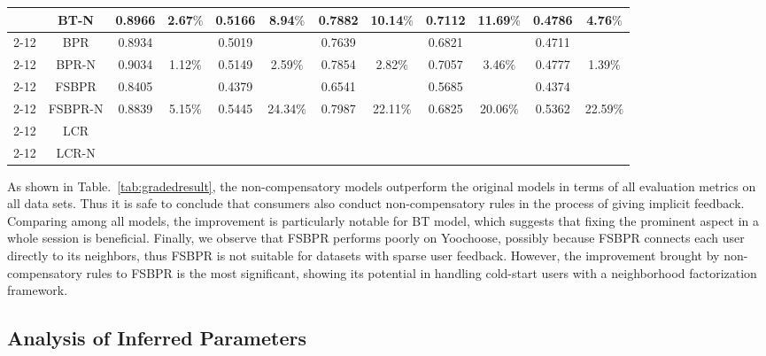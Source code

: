 \documentclass[letterpaper]{article} %
\begin{document}
\begin{table*}[ht]
\begin{center}
\begin{tabular}{|c|c|c|c|c|c|c|c|c|c|c|c|}
	&BT-N	&0.8966 &	2.67$\%$	&0.5166 	&8.94$\%$&	0.7882 	&10.14$\%$&	0.7112 	&11.69$\%$	&0.4786 &	4.76$\%$\\\cline{2-12}
	&BPR	&0.8934 	&&	0.5019 	&&	0.7639 	&&	0.6821 	&&	0.4711 	&\\\cline{2-12}
	&BPR-N	&0.9034 &	1.12$\%$&	0.5149 	&2.59$\%$&	0.7854 &	2.82$\%$&	0.7057 &	3.46$\%$&	0.4777 	&1.39$\%$\\\cline{2-12}
	&FSBPR	&0.8405 	&&	0.4379 	&&	0.6541 	&&	0.5685 	&&	0.4374 	&\\\cline{2-12}
	&FSBPR-N&	0.8839 &	5.15$\%$&	0.5445 	&24.34$\%$&	0.7987 &	22.11$\%$&	0.6825 	&20.06$\%$&	0.5362 &22.59$\%$\\\cline{2-12}
	&LCR	&&&&&&&&&&		\\		\cline{2-12}					
	&LCR-N	&&&&&&&&&&	\\\hline															
\end{tabular}
\end{center}
\label{tab:gradedresult}
\end{table*}%

As shown in Table.~\ref{tab:gradedresult}, the non-compensatory models outperform the original models in terms of all evaluation metrics on all data sets. Thus it is safe to conclude that consumers also conduct non-compensatory rules in the process of giving implicit feedback. Comparing among all models, the improvement is particularly notable for BT model, which suggests that fixing the prominent aspect in a whole session is beneficial. Finally, we observe that FSBPR performs poorly on Yoochoose, possibly because FSBPR connects each user directly to its neighbors, thus FSBPR is not suitable for datasets with sparse user feedback. However, the improvement brought by non-compensatory rules to FSBPR is the most significant, showing its potential in handling cold-start users with a neighborhood factorization framework. 

\subsection{Analysis of Inferred Parameters}
\end{document}
